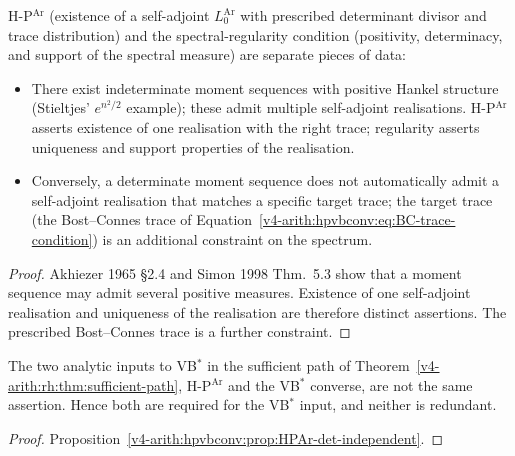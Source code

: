 \begin{proposition}
\label{v4-arith:hpvbconv:prop:HPAr-det-independent}
H-P\(^{\mathrm{Ar}}\) (existence of a
self-adjoint \(L_{0}^{\mathrm{Ar}}\) with prescribed determinant
divisor and trace distribution) and the
spectral-regularity condition (positivity, determinacy, and support of
the spectral measure) are separate pieces of data:
\begin{itemize}
\item There exist indeterminate moment sequences with positive Hankel
structure (Stieltjes' \(e^{n^{2}/2}\) example); these admit multiple
self-adjoint realisations. H-P\(^{\mathrm{Ar}}\) asserts existence of
one realisation with the right trace; regularity asserts uniqueness and
support properties of the realisation.
\item Conversely, a determinate moment sequence does not automatically
admit a self-adjoint realisation that matches a specific target
trace; the target trace (the Bost--Connes trace of
Equation~\ref{v4-arith:hpvbconv:eq:BC-trace-condition}) is an additional
constraint on the spectrum.
\end{itemize}
\end{proposition}

\begin{proof}
Akhiezer 1965 \S 2.4 and Simon 1998 Thm.~5.3 show that a moment
sequence may admit several positive measures. Existence of one
self-adjoint realisation and uniqueness of the realisation are therefore
distinct assertions. The prescribed Bost--Connes trace is a further
constraint.
\end{proof}

\begin{corollary}
\label{v4-arith:hpvbconv:cor:residuals-independent}
The two analytic inputs to VB\(^{*}\) in the
sufficient path of Theorem~\ref{v4-arith:rh:thm:sufficient-path}, H-P\(^{\mathrm{Ar}}\)
and the VB\(^{*}\) converse, are not the same assertion. Hence both are
required for the VB\(^{*}\) input, and neither is redundant.
\end{corollary}

\begin{proof}
Proposition~\ref{v4-arith:hpvbconv:prop:HPAr-det-independent}.
\end{proof}

